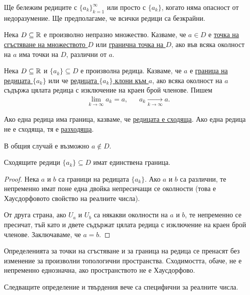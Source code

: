 \documentclass[numbers=endperiod, DIV=15, bibliography=totocnumbered]{scrartcl}
\begin{document}
Ще бележим редиците с ${\{ a_k \}}_{k=1}^\infty$ или просто с $\{ a_k \}$, когато няма опасност от недоразумение. Ще предполагаме, че всички редици са безкрайни.

\begin{definition}
  Нека $D \subseteq \mathbb{R}$ е произволно непразно множество. Казваме, че $a \in D$ е \uline{точка на сгъстяване на множеството $D$} или \uline{гранична точка на $D$}, ако във всяка околност на $a$ има точки на $D$, различни от $a$.
\end{definition}

\begin{definition}
  Нека $D \subseteq \mathbb{R}$ и $\{ a_k \} \subseteq D$ е произволна редица. Казваме, че $a$ е \uline{граница на редицата $\{ a_k \}$} или че \uline{редицата $\{ a_k \}$ клони към $a$}, ако всяка околност на $a$ съдържа цялата редица с изключение на краен брой членове. Пишем
  \begin{align*}
    \lim_{k \to \infty} a_k = a,
    &&
    a_k \underset {k \to \infty} \longrightarrow a.
  \end{align*}

  Ако една редица има граница, казваме, че \uline{редицата е сходяща}. Ако една редица не е сходяща, тя е \uline{разходяща}.
\end{definition}
\begin{note}
  В общия случай е възможно $a \not\in D$.
\end{note}

\begin{proposition}
  Сходящите редици $\{ a_k \} \subseteq D$ имат единствена граница.
\end{proposition}
\begin{proof}
  Нека $a$ и $b$ са граници на редицата $\{ a_k \}$. Ако $a$ и $b$ са различни, те непременно имат поне една двойка непресичащи се околности (това е Хаусдорфовото свойство на реалните числа).

  От друга страна, ако $U_a$ и $U_b$ са някакви околности на $a$ и $b$, те непременно се пресичат, тъй като и двете съдържат цялата редица с изключение на краен брой членове. Заключаваме, че $a = b$.
\end{proof}

\begin{note}
  Определенията за точки на сгъстяване и за граница на редица се пренасят без изменение за произволни топологични пространства. Сходимостта, обаче, не е непременно еднозначна, ако пространството не е Хаусдорфово.

  Следващите определение и твърдения вече са специфични за реалните числа.
\end{note}
\end{document}
